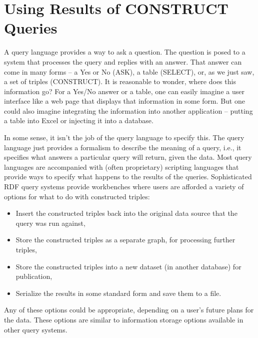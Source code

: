 \section{Using Results of CONSTRUCT Queries}

A query language provides a way to ask a question. The question is posed
to a system that processes the query and replies with an answer. That
answer can come in many forms -- a Yes or No (ASK), a table (SELECT),
or, as we just saw, a set of triples (CONSTRUCT). It is reasonable to
wonder, where does this information go? For a Yes/No answer or a table,
one can easily imagine a user interface like a web page that displays
that information in some form. But one could also imagine integrating
the information into another application -- putting a table into Excel
or injecting it into a database.

In some sense, it isn't the job of the query language to specify this.
The query language just provides a formalism to describe the meaning of
a query, i.e., it specifies what answers a particular query will return,
given the data. Most query languages are accompanied with (often
proprietary) scripting languages that provide ways to specify what
happens to the results of the queries. Sophisticated RDF query systems
provide workbenches where users are afforded a variety of options for
what to do with constructed triples:

\begin {itemize}
\item Insert the constructed triples back into the original data source that
the query was run against,

\item Store the constructed triples as a separate graph, for processing
further triples,

\item Store the constructed triples into a new dataset (in another database)
for publication,

\item Serialize the results in some standard form and save them to a file.
\end{itemize}

Any of these options could be appropriate, depending on a user's future
plans for the data. These options are similar to information storage
options available in other query systems.

